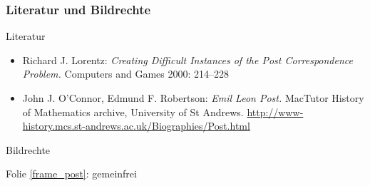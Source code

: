 \documentclass[onlymath]{beamer}
\begin{document}
\begin{frame}[t]\frametitle{Literatur und Bildrechte}

\alert{Literatur}\bigskip

\begin{itemize}
\item Richard J. Lorentz:
\emph{Creating Difficult Instances of the Post Correspondence Problem.}
Computers and Games 2000: 214--228
\item John J. O'Connor, Edmund F. Robertson: \emph{Emil Leon Post.} MacTutor History of Mathematics archive, University of St Andrews. \url{http://www-history.mcs.st-andrews.ac.uk/Biographies/Post.html}
\end{itemize}

\bigskip\bigskip

\alert{Bildrechte}\bigskip

Folie \ref{frame_post}: gemeinfrei

\end{frame}
\end{document}
